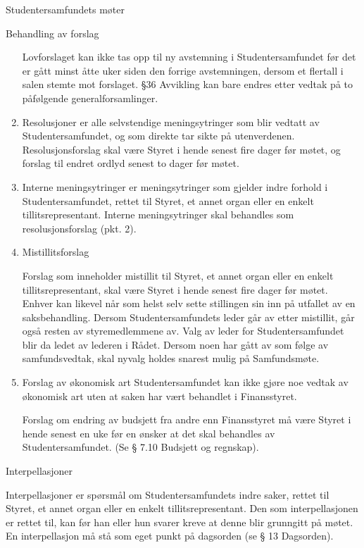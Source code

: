 \documentclass[fsbok.tex]{subfiles}
\begin{document}
\begin{lovkapittel}{Studentersamfundets møter}
\begin{lovparagraf}{Behandling av forslag}
\begin{enumerate}
Lovforslaget kan ikke tas opp til ny avstemning i Studentersamfundet før det er gått minst åtte uker siden den
forrige avstemningen, dersom et flertall i salen stemte mot forslaget. §36 Avvikling kan bare endres etter
vedtak på to påfølgende generalforsamlinger.

\item Resolusjoner er alle selvstendige meningsytringer som blir vedtatt av Studentersamfundet, og som direkte tar
sikte på utenverdenen. Resolusjonsforslag skal være Styret i hende senest fire dager før møtet, og forslag til
endret ordlyd senest to dager før møtet.

\item Interne meningsytringer er meningsytringer som gjelder indre forhold i Studentersamfundet, rettet til Styret,
et annet organ eller en enkelt tillitsrepresentant. Interne meningsytringer skal behandles som
resolusjonsforslag (pkt. 2).

\item Mistillitsforslag

Forslag som inneholder mistillit til Styret, et annet organ eller en enkelt tillitsrepresentant, skal være Styret i
hende senest fire dager før møtet. Enhver kan likevel når som helst selv sette stillingen sin inn på utfallet av
en saksbehandling. Dersom Studentersamfundets leder går av etter mistillit, går også resten av
styremedlemmene av. Valg av leder for Studentersamfundet blir da ledet av lederen i Rådet. Dersom noen
har gått av som følge av samfundsvedtak, skal nyvalg holdes snarest mulig på Samfundsmøte.

\item Forslag av økonomisk art
Studentersamfundet kan ikke gjøre noe vedtak av økonomisk art uten at saken har vært behandlet i
Finansstyret.

Forslag om endring av budsjett fra andre enn Finansstyret må være Styret i hende senest en uke før en ønsker
at det skal behandles av Studentersamfundet. (Se § 7.10 Budsjett og regnskap).

\end{enumerate}

  \end{lovparagraf}
  
  \begin{lovparagraf}{Interpellasjoner}
  
Interpellasjoner er spørsmål om Studentersamfundets indre saker, rettet til Styret, et annet organ eller en enkelt
tillitsrepresentant. Den som interpellasjonen er rettet til, kan før han eller hun svarer kreve at denne blir grunngitt på
møtet. En interpellasjon må stå som eget punkt på dagsorden (se § 13 Dagsorden).
  
  \end{lovparagraf}

\end{lovkapittel}
\end{document}
